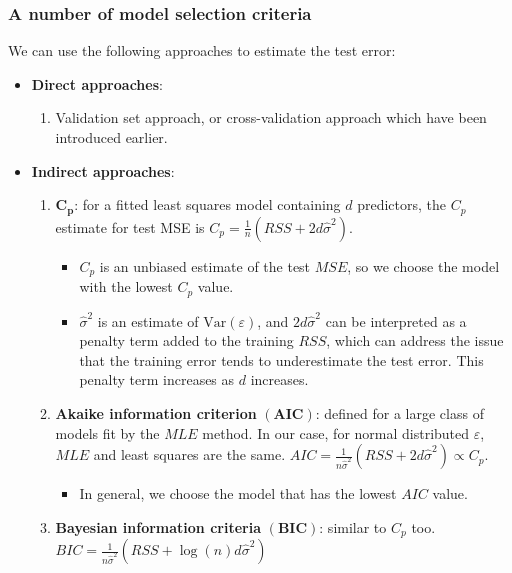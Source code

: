 \documentclass[11pt]{article}
\begin{document}
\subsubsection{A number of model selection criteria}
\noindent We can use the following approaches to estimate the test error:
\begin{itemize}
    \item \textbf{Direct approaches}:
        \begin{enumerate}
            \item Validation set approach, or cross-validation approach which have been introduced earlier.
        \end{enumerate}
    \item \textbf{Indirect approaches}:
        \begin{enumerate}
            \item $\boldsymbol{C_p}$: for a fitted least squares model containing $d$ predictors, the $C_p$ estimate for test MSE is $C_p = \frac{1}{n}(RSS + 2d\hat{\sigma}^2)$.
                \begin{itemize}
                    \item $C_p$ is an unbiased estimate of the test $MSE$, so we choose the model with the lowest $C_p$ value.
                    \item $\hat{\sigma}^2$ is an estimate of $\text{Var}(\varepsilon)$, and $2d\hat\sigma^2$ can be interpreted as a penalty term added to the training $RSS$, which can address the issue that the training error tends to underestimate the test error. This penalty term increases as $d$ increases. 
                \end{itemize}  
            \item \textbf{Akaike information criterion} $\boldsymbol{(AIC)}$: defined for a large class of models fit by the $MLE$ method. In our case, for normal distributed $\varepsilon$, $MLE$ and least squares are the same. $AIC = \frac{1}{n \hat\sigma^2}(RSS + 2d\hat\sigma^2) \propto C_p$.
                \begin{itemize}
                    \item In general, we choose the model that has the lowest $AIC$ value.
                \end{itemize}
            \item \textbf{Bayesian information criteria} $\boldsymbol{(BIC)}$: similar to $C_p$ too. $BIC = \frac{1}{n \hat\sigma^2}(RSS + \log(n)d\hat\sigma^2)$
                \begin{itemize}

\end{itemize}
\end{enumerate}
\end{itemize}
\end{document}
